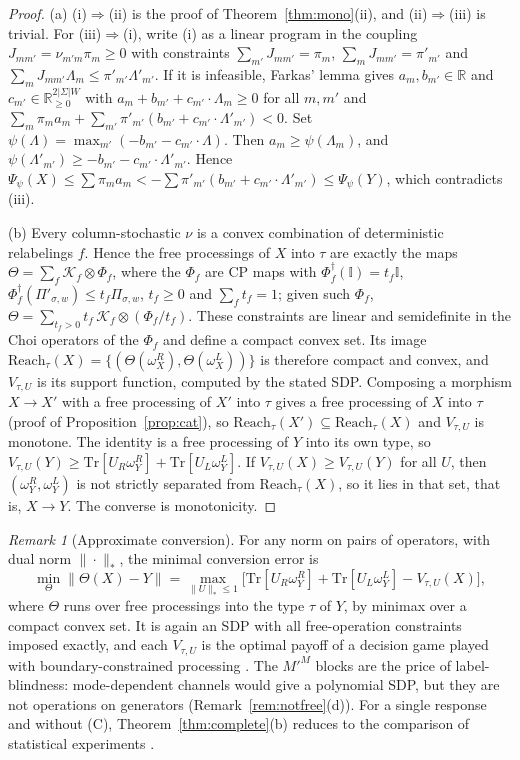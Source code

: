 \documentclass[11pt]{article}
\theoremstyle{definition}
\theoremstyle{remark}
\newtheorem{remark}{Remark}
\newcommand{\Tr}{\mathrm{Tr}}
\newcommand{\one}{\mathbb{I}}
\begin{document}
\begin{proof}
(a) (i)$\Rightarrow$(ii) is the proof of Theorem~\ref{thm:mono}(ii), and (ii)$\Rightarrow$(iii) is trivial. For (iii)$\Rightarrow$(i), write (i) as a linear program in the coupling $J_{mm'}=\nu_{m'm}\pi_m\ge0$ with constraints $\sum_{m'}J_{mm'}=\pi_m$, $\sum_mJ_{mm'}=\pi'_{m'}$ and $\sum_mJ_{mm'}\Lambda_m\le\pi'_{m'}\Lambda'_{m'}$. If it is infeasible, Farkas' lemma \cite{Sch86} gives $a_m,b_{m'}\in\mathbb R$ and $c_{m'}\in\mathbb R^{2|\Sigma|W}_{\ge0}$ with $a_m+b_{m'}+c_{m'}\cdot\Lambda_m\ge0$ for all $m,m'$ and $\sum_m\pi_ma_m+\sum_{m'}\pi'_{m'}(b_{m'}+c_{m'}\cdot\Lambda'_{m'})<0$. Set $\psi(\Lambda)=\max_{m'}(-b_{m'}-c_{m'}\cdot\Lambda)$. Then $a_m\ge\psi(\Lambda_m)$, and $\psi(\Lambda'_{m'})\ge-b_{m'}-c_{m'}\cdot\Lambda'_{m'}$. Hence $\Psi_\psi(X)\le\sum\pi_ma_m<-\sum\pi'_{m'}(b_{m'}+c_{m'}\cdot\Lambda'_{m'})\le\Psi_\psi(Y)$, which contradicts (iii).

(b) Every column-stochastic $\nu$ is a convex combination of deterministic relabelings $f$. Hence the free processings of $X$ into $\tau$ are exactly the maps $\Theta=\sum_f\mathcal K_f\otimes\Phi_f$, where the $\Phi_f$ are CP maps with $\Phi_f^\dagger(\one)=t_f\one$, $\Phi_f^\dagger(\Pi'_{\sigma,w})\le t_f\Pi_{\sigma,w}$, $t_f\ge0$ and $\sum_ft_f=1$; given such $\Phi_f$, $\Theta=\sum_{t_f>0}t_f\,\mathcal K_f\otimes(\Phi_f/t_f)$. These constraints are linear and semidefinite in the Choi operators of the $\Phi_f$ and define a compact convex set. Its image $\mathrm{Reach}_\tau(X)=\{(\Theta(\omega^R_X),\Theta(\omega^L_X))\}$ is therefore compact and convex, and $V_{\tau,U}$ is its support function, computed by the stated SDP. Composing a morphism $X\to X'$ with a free processing of $X'$ into $\tau$ gives a free processing of $X$ into $\tau$ (proof of Proposition~\ref{prop:cat}), so $\mathrm{Reach}_\tau(X')\subseteq\mathrm{Reach}_\tau(X)$ and $V_{\tau,U}$ is monotone. The identity is a free processing of $Y$ into its own type, so $V_{\tau,U}(Y)\ge\Tr[U_R\omega^R_Y]+\Tr[U_L\omega^L_Y]$. If $V_{\tau,U}(X)\ge V_{\tau,U}(Y)$ for all $U$, then $(\omega^R_Y,\omega^L_Y)$ is not strictly separated from $\mathrm{Reach}_\tau(X)$, so it lies in that set, that is, $X\to Y$. The converse is monotonicity.
\end{proof}

\begin{remark}[Approximate conversion]\label{rem:robust}
For any norm on pairs of operators, with dual norm $\|\cdot\|_*$, the minimal conversion error is
\[
\min_{\Theta}\|\Theta(X)-Y\|=\max_{\|U\|_*\le1}\bigl[\Tr[U_R\omega^R_Y]+\Tr[U_L\omega^L_Y]-V_{\tau,U}(X)\bigr],
\]
where $\Theta$ runs over free processings into the type $\tau$ of $Y$, by minimax over a compact convex set. It is again an SDP with all free-operation constraints imposed exactly, and each $V_{\tau,U}$ is the optimal payoff of a decision game played with boundary-constrained processing \cite{TR19,Gour17}. The $M'^M$ blocks are the price of label-blindness: mode-dependent channels would give a polynomial SDP, but they are not operations on generators (Remark~\ref{rem:notfree}(d)). For a single response and without (C), Theorem~\ref{thm:complete}(b) reduces to the comparison of statistical experiments \cite{Bla53,Bus12}.
\end{remark}
\end{document}
